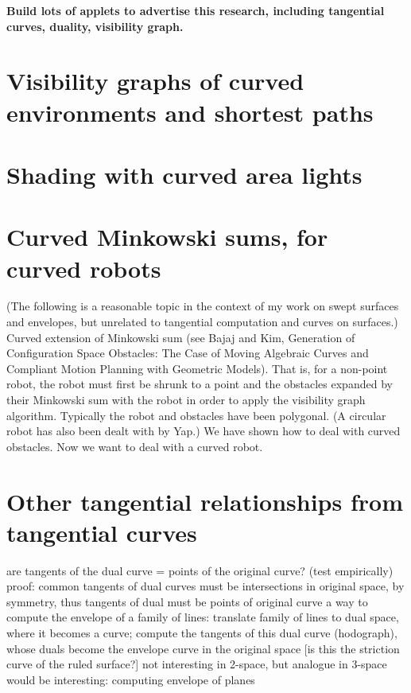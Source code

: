 \documentclass[9pt,twocolumn]{article}
\newcommand{\tangs}{tangential curves\ }
\begin{document}
\clearpage

{\bf Build lots of applets to advertise this research,
including tangential curves, duality, visibility graph.}

\clearpage

\section{Visibility graphs of curved environments and shortest paths}

\section{Shading with curved area lights}

\section{Curved Minkowski sums, for curved robots}

(The following is a reasonable topic in the context of my work on 
swept surfaces and envelopes, but unrelated to tangential computation
and curves on surfaces.)
Curved extension of Minkowski sum (see Bajaj and Kim, Generation of Configuration
Space Obstacles: The Case of Moving Algebraic Curves
and Compliant Motion Planning with Geometric Models).
That is, for a non-point robot, the robot must first be shrunk to a point
and the obstacles expanded by their Minkowski sum with the robot
in order to apply the visibility graph algorithm.
Typically the robot and obstacles have been polygonal.
(A circular robot has also been dealt with by Yap.)
We have shown how to deal with curved obstacles.
Now we want to deal with a curved robot.

\section{Other tangential relationships from \tangs}

are tangents of the dual curve = points of the original curve? (test empirically)
proof: common tangents of dual curves must be intersections in original space, 
	by symmetry, thus tangents of dual must be points of original curve
a way to compute the envelope of a family of lines:
	translate family of lines to dual space, where it becomes a curve;
	compute the tangents of this dual curve (hodograph), 
	whose duals become the envelope curve in the original space
	[is this the striction curve of the ruled surface?]
	not interesting in 2-space, but analogue in 3-space would be interesting:
	computing envelope of planes
	
\end{document}
